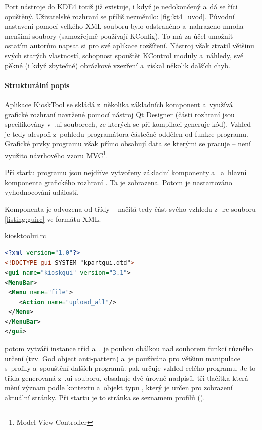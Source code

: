 Port nástroje do KDE4 totiž již existuje, i když je nedokončený a~dá se říci opuštěný. Uživatelské rozhraní se příliš nezměnilo: \ref{fig:kt4_uvod}. Původní nastavení pomocí velkého XML souboru bylo odstraněno a~nahrazeno mnoha menšími soubory (samozřejmě používají KConfig). To má za účel umožnit ostatím autorům napsat si pro své aplikace rozšíření. Nástroj však ztratil většinu svých starých vlastností, schopnost spouštět KControl moduly a~náhledy, své pěkné (i když zbytečné) obrázkové vzezření a~získal několik dalších chyb.

\paragraph{Strukturální popis}
Aplikace KioskTool se skládá z~několika základních komponent a~využívá grafické rozhraní navržené pomocí nástroj Qt Designer (části rozhraní jsou specifikovány v~.ui souborech, ze kterých se při kompilaci generuje kód). Vzhled je tedy alespoň z~pohledu programátora  částečně oddělen od funkce programu. Grafické prvky programu však přímo obsahují data se kterými se pracuje -- není využito návrhového vzoru MVC\footnote{Model-View-Controller}.

Při startu programu jsou nejdříve vytvořeny základní komponenty  a~ a~hlavní komponenta grafického rozhraní . Ta je zobrazena. Potom je nastartováno vyhodnocování událostí.

Komponenta  je odvozena od třídy  -- načítá tedy část svého vzhledu z~.rc souboru \ref{listing:guirc} ve formátu XML.
\begin{mylisting}
\caption{kiosktoolui.rc}
\label{listing:guirc}
\begin{lstlisting}[language=XML]
<?xml version="1.0"?>
<!DOCTYPE gui SYSTEM "kpartgui.dtd">
<gui name="kioskgui" version="3.1">
<MenuBar>
 <Menu name="file">
    <Action name="upload_all"/>
 </Menu>
</MenuBar>
</gui>
\end{lstlisting}
\end{mylisting}

 potom vytváří instance tříd  a~.  je pouhou obálkou nad souborem funkcí různého určení (tzv. God object anti-pattern) a~je používána pro většinu manipulace s~profily a~spouštění dalších programů.  pak určuje vzhled celého programu. Je to třída generovaná z~.ui souboru, obsahuje dvě úrovně nadpisů, tři tlačítka která mění význam podle kontextu a~objekt typu , který je určen pro zobrazení aktuální stránky. Při startu je to stránka se seznamem profilů ().

